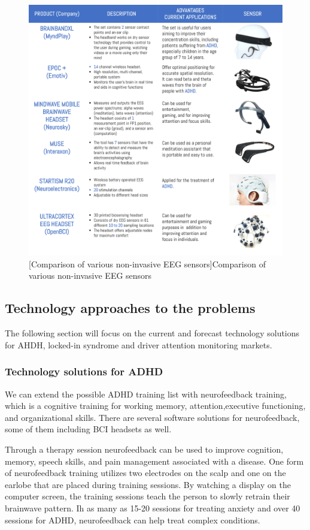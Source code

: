 \documentclass[letterpaper,10pt]{article}
\let\oldsubsection\subsection
\renewcommand{\subsection}{\def\cursectioning{subsection}\oldsubsection}
\begin{document}
\begin{figure}[!htbp]
\centering
\includegraphics[scale=0.262]{sensors.png}
[Comparison of various non-invasive EEG sensors]{Comparison of various non-invasive EEG sensors \cite{bci_fs}}
\label{img:sensors}
\end{figure}

\subsection{Technology approaches to the problems}

The following section will focus on the current and forecast technology solutions for AHDH, locked-in syndrome and driver attention monitoring markets.

\subsubsection{Technology solutions for ADHD}


We can extend the possible ADHD training list with neurofeedback training, which is a cognitive training for working memory, attention,executive functioning, and organizational skills. There are several software solutions for neurofeedback, some of them including BCI headsets as well.

Through a therapy session neurofeedback can be used to improve cognition, memory, speech skills, and pain management associated with a disease. One form of neurofeedback training utilizes two electrodes on the scalp and one on the earlobe that are placed during training sessions. By watching a display on the computer screen, the training sessions teach the person to slowly retrain their brainwave pattern. Ih as many as 15-20 sessions for treating anxiety and over 40 sessions for ADHD, neurofeedback can help treat complex conditions. \cite{bci_fs}
\end{document}
